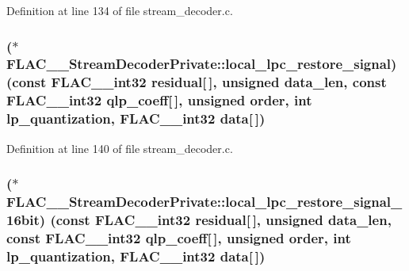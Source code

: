 Definition at line 134 of file stream\+\_\+decoder.\+c.

\subsubsection[{\texorpdfstring{local\+\_\+lpc\+\_\+restore\+\_\+signal}{local_lpc_restore_signal}}]{($\ast$ F\+L\+A\+C\+\_\+\+\_\+\+Stream\+Decoder\+Private\+::local\+\_\+lpc\+\_\+restore\+\_\+signal) ({\bf const} {\bf F\+L\+A\+C\+\_\+\+\_\+int32} {\bf residual}\mbox{[}$\,$\mbox{]}, unsigned data\+\_\+len, {\bf const} {\bf F\+L\+A\+C\+\_\+\+\_\+int32} qlp\+\_\+coeff\mbox{[}$\,$\mbox{]}, unsigned {\bf order}, {\bf int} lp\+\_\+quantization, {\bf F\+L\+A\+C\+\_\+\+\_\+int32} {\bf data}\mbox{[}$\,$\mbox{]})}\hypertarget{struct_f_l_a_c_____stream_decoder_private_a71fb2334e7428467f8f4f9831276c9c1}{}\label{struct_f_l_a_c_____stream_decoder_private_a71fb2334e7428467f8f4f9831276c9c1}


Definition at line 140 of file stream\+\_\+decoder.\+c.

\subsubsection[{\texorpdfstring{local\+\_\+lpc\+\_\+restore\+\_\+signal\+\_\+16bit}{local_lpc_restore_signal_16bit}}]{($\ast$ F\+L\+A\+C\+\_\+\+\_\+\+Stream\+Decoder\+Private\+::local\+\_\+lpc\+\_\+restore\+\_\+signal\+\_\+16bit) ({\bf const} {\bf F\+L\+A\+C\+\_\+\+\_\+int32} {\bf residual}\mbox{[}$\,$\mbox{]}, unsigned data\+\_\+len, {\bf const} {\bf F\+L\+A\+C\+\_\+\+\_\+int32} qlp\+\_\+coeff\mbox{[}$\,$\mbox{]}, unsigned {\bf order}, {\bf int} lp\+\_\+quantization, {\bf F\+L\+A\+C\+\_\+\+\_\+int32} {\bf data}\mbox{[}$\,$\mbox{]})}\hypertarget{struct_f_l_a_c_____stream_decoder_private_a1936ab718a668e75f62afc637dc81cb3}{}\label{struct_f_l_a_c_____stream_decoder_private_a1936ab718a668e75f62afc637dc81cb3}


